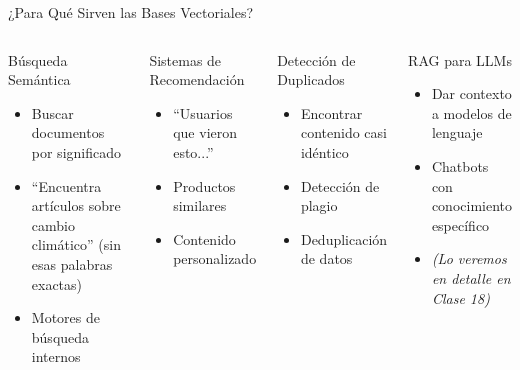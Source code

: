 \documentclass[aspectratio=169]{beamer}
\begin{document}
\begin{frame}{¿Para Qué Sirven las Bases Vectoriales?}
    \begin{columns}[t]
        \begin{block}{Búsqueda Semántica}
            \begin{itemize}
                \item Buscar documentos por significado
                \item ``Encuentra artículos sobre cambio climático'' (sin esas palabras exactas)
                \item Motores de búsqueda internos
            \end{itemize}
        \end{block}
        
        \begin{block}{Sistemas de Recomendación}
            \begin{itemize}
                \item ``Usuarios que vieron esto...''
                \item Productos similares
                \item Contenido personalizado
            \end{itemize}
        \end{block}
        
        \begin{block}{Detección de Duplicados}
            \begin{itemize}
                \item Encontrar contenido casi idéntico
                \item Detección de plagio
                \item Deduplicación de datos
            \end{itemize}
        \end{block}
        
        \begin{block}{RAG para LLMs}
            \begin{itemize}
                \item Dar contexto a modelos de lenguaje
                \item Chatbots con conocimiento específico
                \item \textit{(Lo veremos en detalle en Clase 18)}
            \end{itemize}
        \end{block}
    \end{columns}
\end{frame}
\end{document}
